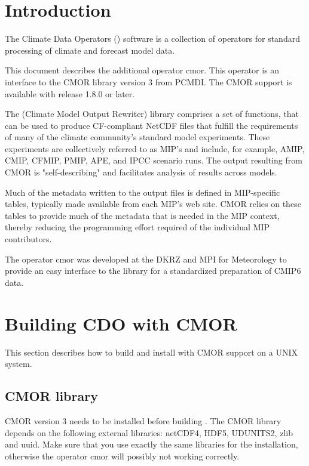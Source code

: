 \chapter{Introduction}

The Climate Data Operators ({\CDO}) software is a collection of operators
for standard processing of climate and forecast model data.

This document describes the additional {\CDO} operator cmor. This
operator is an interface to the CMOR library version 3 from PCMDI.
The CMOR support is available with {\CDO} release 1.8.0 or later.

The \cite{CMOR} (Climate Model Output Rewriter) library comprises a set of
functions, that can be used to produce CF-compliant NetCDF files that 
fulfill the requirements of many of the climate community's standard
model experiments. These experiments are collectively referred to as
MIP's and include, for example, AMIP, CMIP, CFMIP, PMIP, APE, and IPCC 
scenario runs. The output resulting from CMOR is "self-describing" and
facilitates analysis of results across models.

Much of the metadata written to the output files is defined in
MIP-specific tables, typically made available from each MIP's web
site. CMOR relies on these tables to provide much of the metadata 
that is needed in the MIP context, thereby reducing the programming 
effort required of the individual MIP contributors.

The  {\CDO} operator cmor was developed at the DKRZ and MPI for
Meteorology to provide an easy interface to the \cite{CMOR} library for a
standardized preparation of CMIP6 data.

\chapter{Building CDO with CMOR}

This section describes how to build and install {\CDO} with CMOR
support on a UNIX system.

\section{CMOR library}
 
CMOR version 3 needs to be installed before building {\CDO}.
The CMOR library depends on the following external libraries:
netCDF4, HDF5, UDUNITS2, zlib and uuid.
Make sure that you use exactly the same libraries for the {\CDO}
installation, otherwise the operator cmor will possibly not working correctly.

